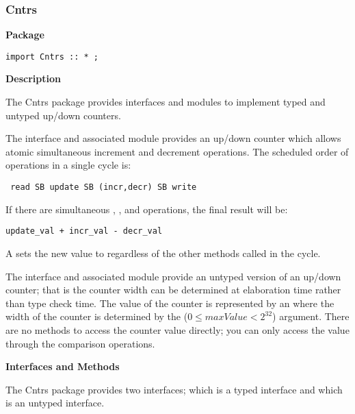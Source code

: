 \subsubsection{Cntrs}
\label{sec-Cntrs}


{\bf Package}

\begin{verbatim}
import Cntrs :: * ;
\end{verbatim}

{\bf Description}

The Cntrs package provides  interfaces and modules to implement
 typed and  untyped up/down counters.  

The  interface and associated  module provides
an 
up/down counter which allows atomic simultaneous increment and
decrement operations.  The scheduled order of operations in a single cycle is:
\begin{verbatim}
 read SB update SB (incr,decr) SB write
\end{verbatim}

If there are simultaneous , , and 
operations, the final result will be:
\begin{verbatim}
update_val + incr_val - decr_val
\end{verbatim}
A  sets the new value to  regardless of the
other methods called in the  cycle.

The  interface and associated  module provide
an untyped version of an up/down counter; that is the counter width
can be determined at elaboration time rather than type check time.
The value of the counter is represented by an  where the
width of the counter is determined by the  ($0 \leq
maxValue <  2^{32}$) argument.  There are no methods to access the
counter value directly; you can only access the value through the
comparison operations.

{\bf Interfaces and Methods}


The Cntrs package provides two interfaces;  which is a typed
interface and  which is an untyped interface.  

